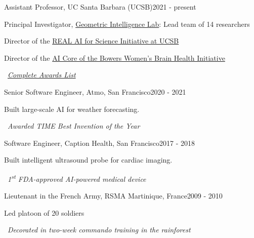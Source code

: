 
\begin{joblong}{Assistant Professor, UC Santa Barbara (UCSB)}{2021 - present}
\item Principal Investigator, \href{https://gi.ece.ucsb.edu/}{Geometric Intelligence Lab}: Lead team of 14 researchers
\item Director of the \href{https://www.ai.ece.ucsb.edu/}{REAL AI for Science Initiative at UCSB}
\item Director of the \href{https://wbhi.ucsb.edu/}{AI Core of the Bowers Women's Brain Health Initiative}
\item {\small{\faAward}}~\href{https://www.ninamiolane.com/pagecv}{\textit{Complete Awards List}}
\end{joblong}

\begin{joblong}{Senior Software Engineer, Atmo, San Francisco}{2020 - 2021}
\item Built large-scale AI for weather forecasting. 
\item {\small{\faAward}}~\textit{Awarded TIME Best Invention of the Year}
\end{joblong}

\begin{joblong}{Software Engineer, Caption Health, San Francisco}{2017 - 2018}
\item Built  intelligent ultrasound probe for cardiac imaging. 
\item {\small{\faAward}}~\textit{1\textsuperscript{st} FDA-approved AI-powered medical device}
\end{joblong}

\begin{joblong}{Lieutenant in the French Army, RSMA Martinique, France}{2009 - 2010}
\item Led platoon of 20 soldiers
\item {\small{\faAward}}~\textit{Decorated in two-week commando training in the rainforest}
\end{joblong}
